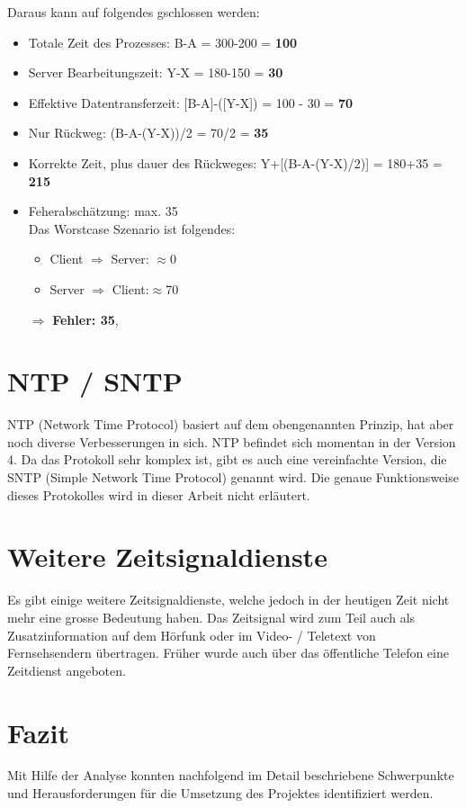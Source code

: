 Daraus kann auf folgendes gschlossen werden:
\begin{itemize}
\item Totale Zeit des Prozesses: B-A = 300-200 = \textbf{100}
\item Server Bearbeitungszeit: Y-X = 180-150 = \textbf{30}
\item Effektive Datentransferzeit: [B-A]-([Y-X]) = 100 - 30 = \textbf{70}
\item Nur Rückweg: (B-A-(Y-X))/2 = 70/2 = \textbf{35}
\item Korrekte Zeit, plus dauer des Rückweges: Y+[(B-A-(Y-X)/2)] = 180+35 = \textbf{215}
\item Feherabschätzung: max. 35\\
Das Worstcase Szenario ist folgendes:\\
\begin{itemize}
\item Client $\Rightarrow$ Server: $\approx$0
\item Server $\Rightarrow$ Client:$ \approx$70
\end{itemize}
$\Rightarrow$ \textbf{Fehler: 35},
\end{itemize}

\section{NTP / SNTP}
NTP (Network Time Protocol) basiert auf dem obengenannten Prinzip, hat aber noch diverse Verbesserungen in sich.
NTP befindet sich momentan in der Version 4.
Da das Protokoll sehr komplex ist, gibt es auch eine vereinfachte Version, die SNTP (Simple Network Time Protocol) genannt wird.
Die genaue Funktionsweise dieses Protokolles wird in dieser Arbeit nicht erläutert.


\section{Weitere Zeitsignaldienste}
Es gibt einige weitere Zeitsignaldienste, welche jedoch in der heutigen Zeit nicht mehr eine grosse Bedeutung haben. Das Zeitsignal wird zum Teil auch als Zusatzinformation auf dem Hörfunk oder im Video- / Teletext von Fernsehsendern übertragen. Früher wurde auch über das öffentliche Telefon eine Zeitdienst angeboten.

\section{Fazit}
Mit Hilfe der Analyse konnten nachfolgend im Detail beschriebene Schwerpunkte und Herausforderungen für die Umsetzung des Projektes identifiziert werden.

